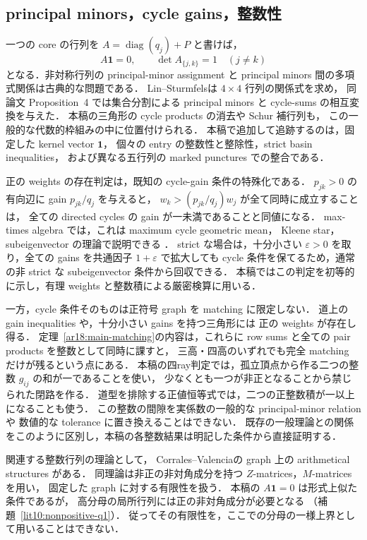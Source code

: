 \subsection{principal minors，cycle gains，整数性}

一つの core の行列を $A=\operatorname{diag}(q_j)+P$ と書けば，
\[
 A\mathbf1=0,\qquad \det A_{\{j,k\}}=1\quad(j\ne k)
\]
となる．非対称行列の principal-minor assignment と
principal minors 間の多項式関係は古典的な問題である．
Lin--Sturmfels\cite{LinSturmfels}は $4\times4$ 行列の関係式を求め，
同論文 Proposition~4 では集合分割による principal minors と cycle-sums の相互変換を与えた．
本稿の三角形の cycle products の消去や Schur 補行列も，
この一般的な代数的枠組みの中に位置付けられる．
本稿で追加して追跡するのは，固定した kernel vector $\mathbf1$，
個々の entry の整数性と整除性，strict basin inequalities，
および異なる五行列の marked punctures での整合である．

正の weights の存在判定は，既知の cycle-gain 条件の特殊化である．
$p_{jk}>0$ の有向辺に gain $p_{jk}/q_j$ を与えると，
$w_k>(p_{jk}/q_j)w_j$ が全て同時に成立することは，
全ての directed cycles の gain が一未満であることと同値になる．
max-times algebra では，これは maximum cycle geometric mean，
Kleene star，subeigenvector の理論で説明できる
\cite[\S2, Theorem~2.2 and Proposition~2.5]{SergeevSchneiderButkovic}．
strict な場合は，十分小さい $\varepsilon>0$ を取り，全ての gains を共通因子 $1+\varepsilon$ で拡大しても
cycle 条件を保てるため，通常の非 strict な subeigenvector 条件から回収できる．
本稿ではこの判定を初等的に示し，有理 weights と整数積による厳密検算に用いる．

一方，cycle 条件そのものは正符号 graph を matching に限定しない．
道上の gain inequalities や，十分小さい gains を持つ三角形には
正の weights が存在し得る．
定理~\ref{ar18:main-matching}の内容は，これらに
row sums と全ての pair products を整数として同時に課すと，
三高・四高のいずれでも完全 matching だけが残るという点にある．
本稿の四ray判定では，孤立頂点から作る二つの整数 $g_{ij}$ の和が一であることを使い，
少なくとも一つが非正となることから禁じられた閉路を作る．
道型を排除する正値恒等式では，二つの正整数積が一以上になることも使う．
この整数の間隙を実係数の一般的な principal-minor relation や
数値的な tolerance に置き換えることはできない．
既存の一般理論との関係をこのように区別し，本稿の各整数結果は明記した条件から直接証明する．

関連する整数行列の理論として，
Corrales--Valencia\cite[\S\S2--3]{CorralesValencia}の graph 上の arithmetical structures がある．
同理論は非正の非対角成分を持つ $Z$-matrices，$M$-matrices を用い，
固定した graph に対する有限性を扱う．
本稿の $A\mathbf1=0$ は形式上似た条件であるが，
高分母の局所行列には正の非対角成分が必要となる
（補題~\ref{lit10:nonpositive-q1}）．
従ってその有限性を，ここでの分母の一様上界として用いることはできない．


